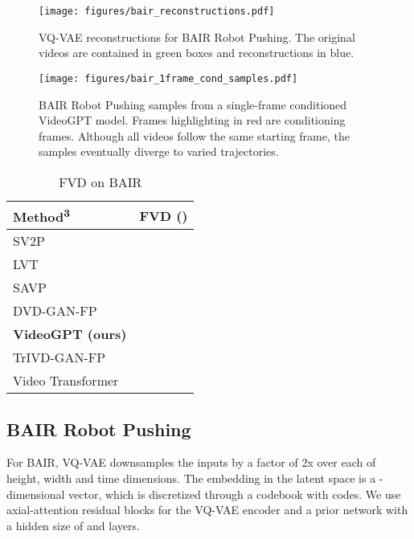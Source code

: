 \begin{figure*}[h]
    \centering
    \texttt{[image: figures/bair\_reconstructions.pdf]}
    \caption{VQ-VAE reconstructions for BAIR Robot Pushing. The original videos are contained in green boxes and reconstructions in blue. }
    \label{fig:bair_recon}
\end{figure*}
\begin{figure*}[h]
    \centering
    \texttt{[image: figures/bair\_1frame\_cond\_samples.pdf]}
    \caption{BAIR Robot Pushing samples from a single-frame conditioned VideoGPT model. Frames highlighting in red are conditioning frames. Although all videos follow the same starting frame, the samples eventually diverge to varied trajectories.}
    \label{fig:bair_pushing}

\end{figure*}

\begin{table}[h]
    
        \centering
    
        \caption{FVD on BAIR}
        \label{table:bair_fvd}
        \begin{tabular}{ll}
            \toprule
            Method\textsuperscript{3}                   & FVD ()                \\ \midrule
            SV2P                    &             \\
            LVT                     &            \\
            SAVP                    &             \\
            DVD-GAN-FP              &             \\
            \textbf{VideoGPT (ours)}          &             \\
            TrIVD-GAN-FP           &              \\
            Video Transformer        &  \\ \bottomrule
        \end{tabular}
\end{table}

\subsection{BAIR Robot Pushing}

For BAIR, VQ-VAE downsamples the inputs by a factor of 2x over each of height, width and time dimensions. The embedding in the latent space is a -dimensional vector, which is discretized through a codebook with  codes. We use  axial-attention residual blocks for the VQ-VAE encoder and a prior network with a hidden size of  and  layers.

